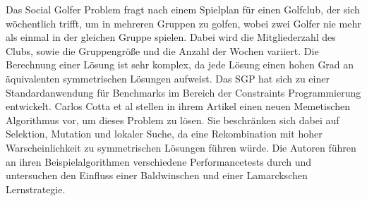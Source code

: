 Das Social Golfer Problem fragt nach einem Spielplan für einen Golfclub, der sich wöchentlich trifft, um in mehreren Gruppen zu golfen, wobei zwei Golfer nie mehr als einmal in der gleichen Gruppe spielen.
Dabei wird die Mitgliederzahl des Clubs, sowie die Gruppengröße und die Anzahl der Wochen variiert.
Die Berechnung einer Lösung ist sehr komplex, da jede Lösung einen hohen Grad an äquivalenten symmetrischen Lösungen aufweist.
Das SGP hat sich zu einer Standardanwendung für Benchmarks im Bereich der Constraints Programmierung entwickelt.
Carlos Cotta et al stellen in ihrem Artikel einen neuen Memetischen Algorithmus vor, um dieses Problem zu lösen. 
Sie beschränken sich dabei auf Selektion, Mutation und lokaler Suche, da eine Rekombination mit hoher Warscheinlichkeit zu symmetrischen Lösungen führen würde.
Die Autoren führen an ihren Beispielalgorithmen verschiedene Performancetests durch und untersuchen den Einfluss einer Baldwinschen und einer Lamarckschen Lernstrategie.
